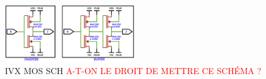 
\begin{figure}[h]
	\label{ivxbufmos}
	\includegraphics[width=0.5\textwidth]{./figures/IVX_BUFF_X4_2.pdf}
	\caption{IVX MOS SCH \textcolor{red}{A-T-ON LE DROIT DE METTRE CE SCHÉMA ?}}
\end{figure}

